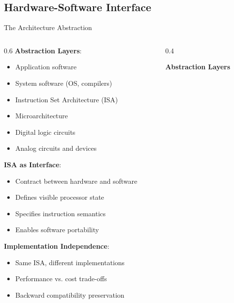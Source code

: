 \documentclass[aspectratio=169]{beamer}
\newcommand{\concept}[1]{\textbf{\color{darkblue}#1}}
\begin{document}
\subsection{Hardware-Software Interface}

\begin{frame}{The Architecture Abstraction}
\begin{columns}
\begin{column}{0.6\textwidth}
\concept{Abstraction Layers}:
\begin{itemize}
\item Application software
\item System software (OS, compilers)
\item Instruction Set Architecture (ISA)
\item Microarchitecture
\item Digital logic circuits
\item Analog circuits and devices
\end{itemize}

\vspace{0.3cm}
\concept{ISA as Interface}:
\begin{itemize}
\item Contract between hardware and software
\item Defines visible processor state
\item Specifies instruction semantics
\item Enables software portability
\end{itemize}

\vspace{0.3cm}
\concept{Implementation Independence}:
\begin{itemize}
\item Same ISA, different implementations
\item Performance vs. cost trade-offs
\item Backward compatibility preservation
\end{itemize}
\end{column}
\begin{column}{0.4\textwidth}
\begin{center}
\textbf{Abstraction Layers}
\vspace{0.3cm}

\end{center}
\end{column}
\end{columns}
\end{frame}
\end{document}
